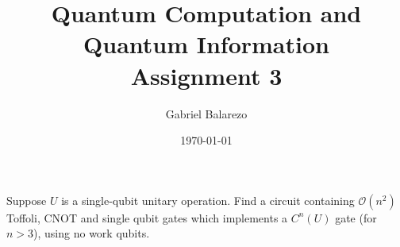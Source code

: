\documentclass[12 pt]{article}
\title{Quantum Computation and Quantum Information\\
Assignment 3}
\author{Gabriel Balarezo}
\date{\today}
\begin{document}
\maketitle

\begin{mdframed}[backgroundcolor = gray!30,
  frametitle = Exercise 4.30]
  Suppose $U$ is a single-qubit unitary operation. Find a circuit containing $\mathcal{O}(n^2)$ Toffoli, CNOT and single qubit gates which implements a $C^n (U)$ gate (for $n>3$), using no work qubits. 
\end{mdframed}
\end{document}

